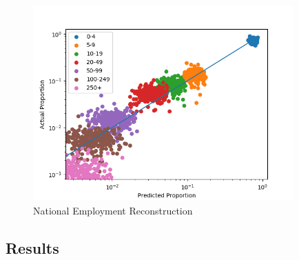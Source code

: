 \documentclass[a4paper,10pt]{article}
\begin{document}
   \begin{figure}
      \begin{center}
         \includegraphics[width=10cm]{graphs/national_distribution_employment_reconstuction}
         \caption{National Employment Reconstruction}
         \label{enterprise_employment_reconstruction}
      \end{center}
   \end{figure}

   \subsection{Results}

   \medskip
\end{document}
